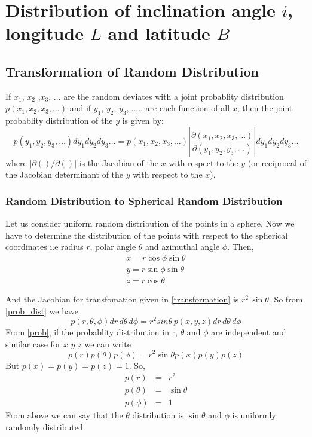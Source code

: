 \chapter{Distribution of inclination angle $i$, longitude $L$ and latitude $B$}
\section{Transformation of Random Distribution}
If $x_1$, $x_2$ ,$x_3$, $\ldots$ are the random deviates with a joint probablity distribution $p(x_1,x_2,x_3,\ldots)$ and if $y_1$, $y_2$, $y_3$,$\ldots\ldots$ are each function of all $x$, then the joint probablity distribution of the $y$ is given by:
\begin{equation}\label{prob_dist}
p(y_1,y_2,y_3,\ldots)dy_1dy_2dy_3\ldots = p(x_1,x_2,x_3,\ldots)\left|\frac{\partial(x_1,x_2,x_3,\ldots)}{\partial(y_1,y_2,y_3,\ldots)}\right|dy_1dy_2dy_3\ldots
\end{equation} 
where $|\partial()/\partial()|$ is the Jacobian of the $x$ with respect to the $y$ (or reciprocal of the Jacobian determinant of the $y$ with respect to the $x$).
\subsection{Random Distribution to Spherical Random Distribution}
Let us consider uniform random distribution of the points in a sphere. Now we have to determine the distribution of the points with respect to the spherical coordinates i.e radius $r$, polar angle $\theta$ and azimuthal angle $\phi$. Then,
\begin{equation}\label{transformation}
\begin{aligned}
x=r\cos\phi\sin\theta\\
y=r\sin\phi\sin\theta\\
z=r\cos\theta
\end{aligned}
\end{equation}

And the Jacobian for transfomation given in \eqref{transformation} is $r^2\,\sin\theta$.
So from \eqref{prob_dist} we have
\begin{equation}\label{prob}
p(r,\theta,\phi)dr\,d\theta\,d\phi=r^2sin\theta\,p(x,y,z)dr\,d\theta\,d\phi
\end{equation}
From \eqref{prob}, if the probablity distribution in r, $\theta$ and $\phi$ are independent and similar case for $x\,\,y\,\,z$ we can write
\begin{equation}
p(r) p(\theta) p(\phi) = r^2 \sin\theta p(x) p(y) p(z)
\end{equation}
But $p(x)=p(y)=p(z)=1$. So,
\begin{equation}
\begin{aligned}
p(r)&=&r^2\\p(\theta)&=&\sin\theta\\p(\phi)&=&1
\end{aligned}
\end{equation} 
From above we can say that the $\theta$ distribution is $\sin\theta$ and $\phi$ is uniformly randomly distributed.
